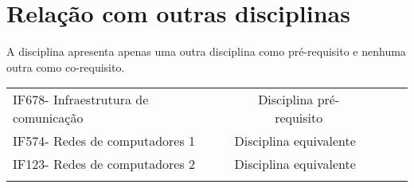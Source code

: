\documentclass{article}
\begin{document}
\section{Relação com outras disciplinas}
A disciplina apresenta apenas uma outra disciplina como pré-requisito e nenhuma outra como co-requisito.
\begin{table}[h]
\begin{tabular}{lllll}
IF678- Infraestrutura de comunicação & \multicolumn{1}{c}{Disciplina pré-requisito} &  &  &  \\
IF574- Redes de computadores 1       & Disciplina equivalente                             &  &  &  \\
IF123- Redes de computadores 2       & Disciplina equivalente                             &  &  &  \\
                                     &                                                    &  &  & 
\end{tabular}

\end{table}


\end{document}
